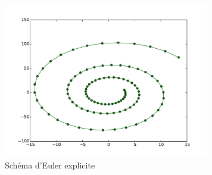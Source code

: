 \begin{figure}[h]
  \centering
  \includegraphics[width=9cm]{./Edyngrav_1_fig.pdf}
  \caption{Schéma d'Euler explicite}
  \label{fig:Edyngrav_1}
\end{figure}


